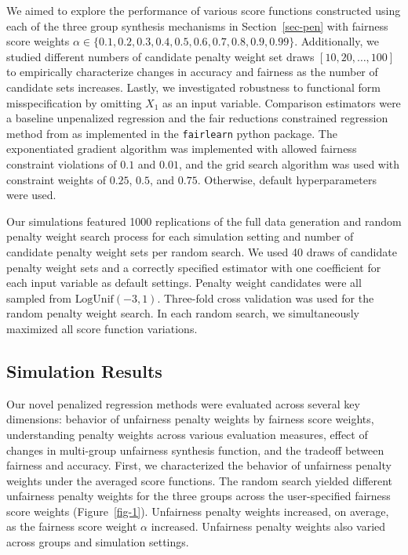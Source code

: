 \documentclass[
  12pt]{article}
\begin{document}
We aimed to explore the performance of various score functions
constructed using each of the three group synthesis mechanisms in
Section~\ref{sec-pen} with fairness score weights
\(\alpha \in \{0.1, 0.2, 0.3, 0.4, 0.5, 0.6, 0.7, 0.8, 0.9, 0.99 \}\).
Additionally, we studied different numbers of candidate penalty weight
set draws \([10, 20, \dots, 100]\) to empirically characterize changes
in accuracy and fairness as the number of candidate sets increases.
Lastly, we investigated robustness to functional form misspecification
by omitting \(X_1\) as an input variable. Comparison estimators were a
baseline unpenalized regression and the fair reductions constrained
regression method from \citet{agarwal_reductions_2018} as implemented in
the \texttt{fairlearn} python package. The exponentiated gradient
algorithm was implemented with allowed fairness constraint violations of
\(0.1\) and \(0.01\), and the grid search algorithm was used with
constraint weights of \(0.25\), \(0.5\), and \(0.75\). Otherwise,
default hyperparameters were used.

Our simulations featured 1000 replications of the full data generation
and random penalty weight search process for each simulation setting and
number of candidate penalty weight sets per random search. We used 40
draws of candidate penalty weight sets and a correctly specified
estimator with one coefficient for each input variable as default
settings. Penalty weight candidates were all sampled from
\(\text{LogUnif}(-3,1)\). Three-fold cross validation was used for the
random penalty weight search. In each random search, we simultaneously
maximized all score function variations.

\subsection{Simulation Results}\label{simulation-results}

Our novel penalized regression methods were evaluated across several key
dimensions: behavior of unfairness penalty weights by fairness score
weights, understanding penalty weights across various evaluation
measures, effect of changes in multi-group unfairness synthesis
function, and the tradeoff between fairness and accuracy. First, we
characterized the behavior of unfairness penalty weights under the
averaged score functions. The random search yielded different unfairness
penalty weights for the three groups across the user-specified fairness
score weights (Figure~\ref{fig-1}). Unfairness penalty weights
increased, on average, as the fairness score weight \(\alpha\)
increased. Unfairness penalty weights also varied across groups and
simulation settings.
\end{document}
